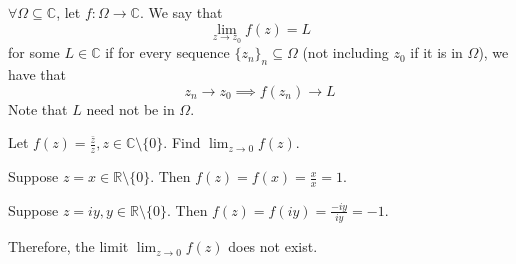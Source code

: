 \documentclass[11pt, oneside]{book}
\begin{document}
\begin{defn}\label{defn:Convergence for Complex Functions}
	$\forall \Omega \subseteq \mathbb{C}$, let $f: \Omega \to \mathbb{C}$. We say that
	\begin{equation}
		\lim_{z \to z_0} f(z) = L
	\end{equation}
	for some $L \in \mathbb{C}$ if for every sequence $\{z_n\}_n \subseteq \Omega$ (not including $z_0$ if it is in $\Omega$), we have that
	\begin{equation}
		z_n \to z_0 \implies f(z_n) \to L
	\end{equation}
	Note that $L$ need not be in $\Omega$.
\end{defn}

\begin{eg}\label{eg:limit dne}
	Let $f(z) = \frac{\bar{z}}{z}, z \in \mathbb{C} \setminus \{0\}$. Find $\lim_{z \to 0} f(z)$.

	\begin{solution}
		Suppose $z = x \in \mathbb{R} \setminus \{0\}$. Then $f(z) = f(x) = \frac{x}{x} = 1$.

		Suppose $z = iy, y \in \mathbb{R} \setminus \{0\}$. Then $f(z) = f(iy) = \frac{-iy}{iy} = -1$.

		Therefore, the limit $\lim_{z \to 0} f(z)$ does not exist.
	\end{solution}
\end{eg}
\end{document}
